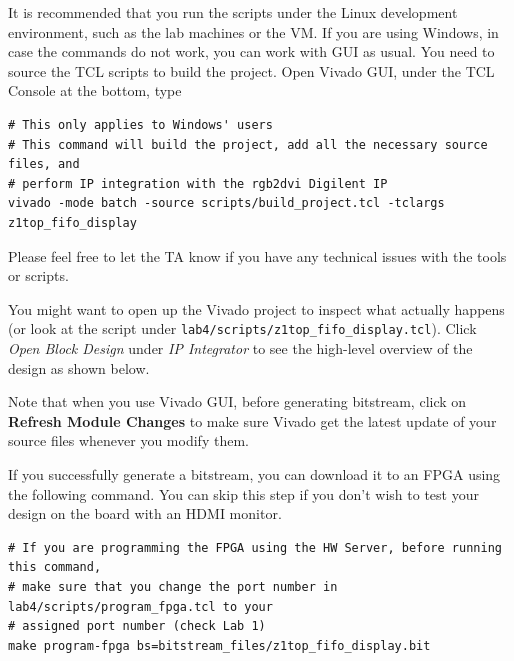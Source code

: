 \documentclass[11pt]{article}
\begin{document}
It is recommended that you run the scripts under the Linux development environment, such as the lab machines or the VM. If you are using Windows, in case the commands do not work, you can work with GUI as usual. You need to source the TCL scripts to build the project. Open Vivado GUI, under the TCL Console at the bottom, type

\begin{verbatim}
# This only applies to Windows' users
# This command will build the project, add all the necessary source files, and
# perform IP integration with the rgb2dvi Digilent IP
vivado -mode batch -source scripts/build_project.tcl -tclargs z1top_fifo_display
\end{verbatim}

Please feel free to let the TA know if you have any technical issues with the tools or scripts.

You might want to open up the Vivado project to inspect what actually happens (or look at the script under \verb|lab4/scripts/z1top_fifo_display.tcl|). Click \emph{Open Block Design} under \emph{IP Integrator} to see the high-level overview of the design as shown below.

\begin{center}
\end{center}

Note that when you use Vivado GUI, before generating bitstream, click on \textbf{Refresh Module Changes} to make sure Vivado get the latest update of your source files whenever you modify them.

If you successfully generate a bitstream, you can download it to an FPGA using the following command. You can skip this step if you don't wish to test your design on the board with an HDMI monitor.

\begin{verbatim}
# If you are programming the FPGA using the HW Server, before running this command,
# make sure that you change the port number in lab4/scripts/program_fpga.tcl to your
# assigned port number (check Lab 1)
make program-fpga bs=bitstream_files/z1top_fifo_display.bit
\end{verbatim}
\end{document}
